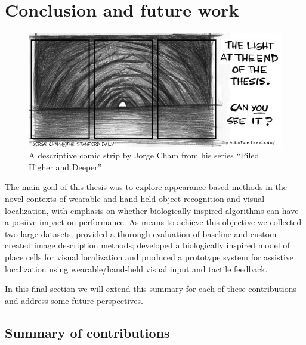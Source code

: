 \chapter{Conclusion and future work}\label{ch:conclusion}

\begin{figure}[h!]
\centering
\includegraphics[width=.8\textwidth]{./gfx/Chapter07/phd051700s.jpg}
\caption{A descriptive comic strip by Jorge Cham from his series ``Piled Higher and Deeper'' \cite{Cham}}
\end{figure}

The main goal of this thesis was to explore appearance-based methods in the novel contexts of wearable and hand-held object recognition and visual localization, with emphasis on whether biologically-inspired algorithms can have a posiive impact on performance. As means to achieve this objective we collected two large datasets; provided a thorough evaluation of baseline and custom-created image description methods; developed a biologically inspired model of place cells for visual localization and produced a prototype system for assistive localization using wearable/hand-held visual input and tactile feedback.

In this final section we will extend this summary for each of these contributions and address some future perspectives.

\section{Summary of contributions}

